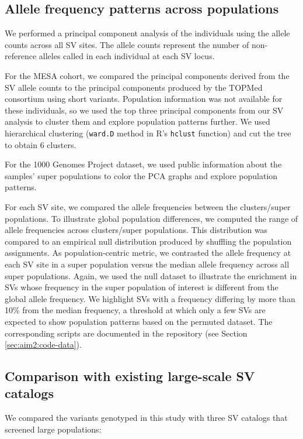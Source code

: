 \documentclass[11pt]{ucscthesis}
\begin{document}
\subsection{Allele frequency patterns across populations}
\label{subsec:aim2:sv-pop-freq}


We performed a principal component analysis of the individuals using the allele counts across all SV sites.
The allele counts represent the number of non-reference alleles called in each individual at each SV locus.

For the MESA cohort, we compared the principal components derived from the SV allele counts to the principal components produced by the TOPMed consortium using short variants.
Population information was not available for these individuals, so we used the top three principal components from our SV analysis to cluster them and explore population patterns further.
We used hierarchical clustering (\verb!ward.D! method in R's \verb!hclust! function) and cut the tree to obtain 6 clusters.

For the 1000 Genomes Project dataset, we used public information about the samples' super populations to color the PCA graphs and explore population patterns.

For each SV site, we compared the allele frequencies between the clusters/super populations.
To illustrate global population differences, we computed the range of allele frequencies across clusters/super populations.
This distribution was compared to an empirical null distribution produced by shuffling the population assignments.
As population-centric metric, we contrasted the allele frequency at each SV site in a super population versus the median allele frequency across all super populations.
Again, we used the null dataset to illustrate the enrichment in SVs whose frequency in the super population of interest is different from the global allele frequency.
We highlight SVs with a frequency differing by more than 10\% from the median frequency, a threshold at which only a few SVs are expected to show population patterns based on the permuted dataset.
The corresponding scripts are documented in the repository (see Section \ref{sec:aim2:code-data}).

\subsection{Comparison with existing large-scale SV catalogs}

We compared the variants genotyped in this study with three SV catalogs that screened large populations:
\end{document}
